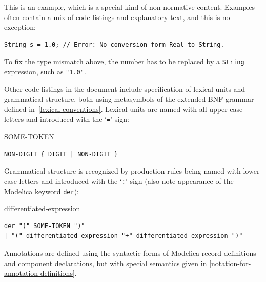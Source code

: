 \begin{example}
This is an example, which is a special kind of non-normative content.
Examples often contain a mix of code listings and explanatory text, and this is no exception:
\begin{lstlisting}[language=modelica]
String s = 1.0; // Error: No conversion form Real to String.
\end{lstlisting}
To fix the type mismatch above, the number has to be replaced by a \lstinline!String! expression, such as \lstinline!"1.0"!.
\end{example}

Other code listings in the document include specification of lexical units and grammatical structure, both using metasymbols of the extended BNF-grammar defined in~\cref{lexical-conventions}.
Lexical units are named with all upper-case letters and introduced with the `\lstinline[language=grammar]!=!' sign:
\begin{lexicalunit*}{SOME-TOKEN}
\begin{lstlisting}
NON-DIGIT { DIGIT | NON-DIGIT }
\end{lstlisting}
\end{lexicalunit*}

Grammatical structure is recognized by production rules being named with lower-case letters and introduced with the `\lstinline[language=grammar]!:!' sign (also note appearance of the Modelica keyword \lstinline!der!):
\begin{production*}{differentiated-expression}
\begin{lstlisting}
der "(" SOME-TOKEN ")"
| "(" differentiated-expression "+" differentiated-expression ")"
\end{lstlisting}
\end{production*}

Annotations are defined using the syntactic forms of Modelica record definitions and component declarations, but with special semantics given in \cref{notation-for-annotation-definitions}.

